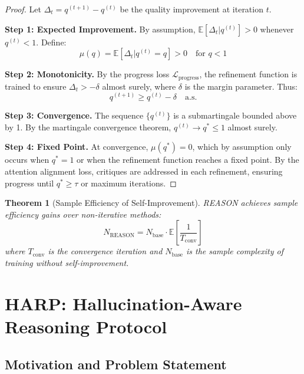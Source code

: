 \documentclass[11pt,a4paper]{article}
\newtheorem{theorem}{Theorem}[section]
\newcommand{\E}{\mathbb{E}}
\newcommand{\calL}{\mathcal{L}}
\begin{document}
\begin{proof}
Let $\Delta_t = q^{(t+1)} - q^{(t)}$ be the quality improvement at iteration $t$.

\textbf{Step 1: Expected Improvement.} By assumption, $\E[\Delta_t | q^{(t)}] > 0$ whenever $q^{(t)} < 1$. Define:
\begin{equation}
    \mu(q) = \E[\Delta_t | q^{(t)} = q] > 0 \quad \text{for } q < 1
\end{equation}

\textbf{Step 2: Monotonicity.} By the progress loss $\calL_{\text{progress}}$, the refinement function is trained to ensure $\Delta_t > -\delta$ almost surely, where $\delta$ is the margin parameter. Thus:
\begin{equation}
    q^{(t+1)} \geq q^{(t)} - \delta \quad \text{a.s.}
\end{equation}

\textbf{Step 3: Convergence.} The sequence $\{q^{(t)}\}$ is a submartingale bounded above by 1. By the martingale convergence theorem, $q^{(t)} \to q^* \leq 1$ almost surely.

\textbf{Step 4: Fixed Point.} At convergence, $\mu(q^*) = 0$, which by assumption only occurs when $q^* = 1$ or when the refinement function reaches a fixed point. By the attention alignment loss, critiques are addressed in each refinement, ensuring progress until $q^* \geq \tau$ or maximum iterations.
\end{proof}

\begin{theorem}[Sample Efficiency of Self-Improvement]
REASON achieves sample efficiency gains over non-iterative methods:
\begin{equation}
    N_{\text{REASON}} = N_{\text{base}} \cdot \E\left[\frac{1}{T_{\text{conv}}}\right]
\end{equation}
where $T_{\text{conv}}$ is the convergence iteration and $N_{\text{base}}$ is the sample complexity of training without self-improvement.
\end{theorem}

\section{HARP: Hallucination-Aware Reasoning Protocol}

\subsection{Motivation and Problem Statement}
\end{document}

